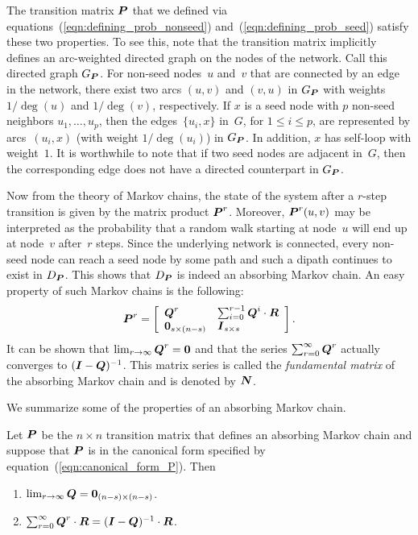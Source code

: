 The transition matrix $\boldsymbol{P}$ that we defined via equations~(\ref{eqn:defining_prob_nonseed}) 
and~(\ref{eqn:defining_prob_seed}) satisfy these two properties. To see this, note that 
the transition matrix implicitly defines an arc-weighted  directed graph on the nodes 
of the network. Call this directed graph $G_{\boldsymbol{P}}$. For non-seed nodes~$u$ and~$v$ that 
are connected by an edge in the network, there exist two arcs $(u, v)$ and $(v, u)$ 
in $G_{\boldsymbol{P}}$ with weights $1/\deg (u)$ and $1/ \deg (v)$, respectively.
If $x$ is a seed node with $p$ non-seed neighbors 
$u_1, \ldots, u_p$, then the edges~$\{u_i, x\}$ in~$G$, for $1 \leq i \leq p$, 
are represented by arcs~$(u_i, x)$ (with weight $1 / \deg (u_i)$) in $G_{\boldsymbol{P}}$. 
In addition, $x$ has self-loop with weight~$1$. It is worthwhile to note 
that if two seed nodes are adjacent in~$G$, then the corresponding edge does not have a 
directed counterpart in $G_{\boldsymbol{P}}$.  

Now from the theory of Markov chains, the state of the system after a $r$-step transition 
is given by the matrix product $\boldsymbol{P}^r$. Moreover, $\boldsymbol{P}^r (u, v)$ may be interpreted 
as the probability that a random walk starting at node~$u$ will end up at node~$v$ 
after~$r$ steps. Since the underlying network is connected, every non-seed node can reach a seed
node by some path and such a dipath continues to exist in $D_{\boldsymbol{P}}$. This shows that $D_{\boldsymbol{P}}$
is indeed an absorbing Markov chain. An easy property of such Markov chains is the following:
\begin{equation}\label{exp:rth_product_of_P}
	\boldsymbol{P}^r = \left [ \begin{array}{ll}
						\boldsymbol{Q}^r  					& \sum_{i = 0}^{r - 1}\boldsymbol{Q}^i \cdot \boldsymbol{R} \\
						 \boldsymbol{0}_{s \times (n - s)} & \boldsymbol{I}_{s \times s}
						\end{array}
				\right ].
\end{equation}  
It can be shown that $\lim_{r \to \infty} \boldsymbol{Q}^{r} = \boldsymbol{0}$ and that 
the series $\sum_{r = 0}^{\infty} \boldsymbol{Q}^{r}$ actually converges to 
$(\boldsymbol{I} - \boldsymbol{Q})^{-1}$. This matrix series is called the \emph{fundamental matrix}
of the absorbing Markov chain and is denoted by $\boldsymbol{N}$. 

We summarize some of the properties of an absorbing Markov chain. 
\begin{proposition}\label{prop:limiting_Q}
	Let $\boldsymbol{P}$ be the $n \times n$ transition matrix that defines an absorbing Markov chain
	and suppose that $\boldsymbol{P}$ is in the canonical form specified by equation~(\ref{eqn:canonical_form_P}). 
	Then
	\begin{enumerate}
		\item $\lim_{r \to \infty} \boldsymbol{Q} = \boldsymbol{0}_{(n - s) \times (n - s)}$.
		\item $\sum_{r = 0}^{\infty} \boldsymbol{Q}^r \cdot \boldsymbol{R} = (\boldsymbol{I} - \boldsymbol{Q})^{-1} \cdot \boldsymbol{R}$.
	\end{enumerate} 
\end{proposition}

